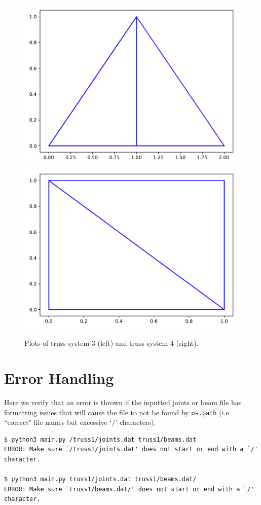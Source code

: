 \documentclass[11pt]{amsart}
\theoremstyle{definition}
\begin{document}
\begin{figure}[h]
\centerline{\includegraphics[scale=.4]{Figure3.pdf} \includegraphics[scale=.4]{Figure4.pdf}}
\caption{Plots of truss system 3 (left) and truss system 4 (right).}
\end{figure}


\section{Error Handling}
Here we verify that an error is thrown if the inputted joints or beam file has formatting issues that will cause the file to not be found by \texttt{os.path} (i.e. ``correct" file names but excessive `/' characters).
\begin{Verbatim}[fontsize=\small]
$ python3 main.py /truss1/joints.dat truss1/beams.dat
ERROR: Make sure `/truss1/joints.dat' does not start or end with a `/' character.

$ python3 main.py truss1/joints.dat truss1/beams.dat/
ERROR: Make sure `truss1/beams.dat/' does not start or end with a `/' character.
\end{Verbatim}
\end{document}

